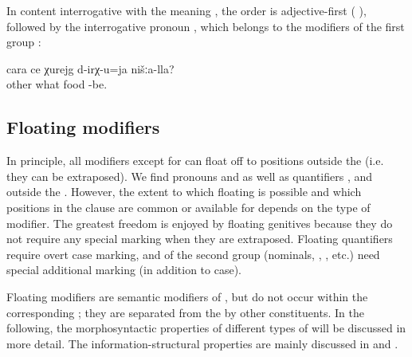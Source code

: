 In content interrogative  with the meaning , the order is adjective-first ( ), followed by the interrogative pronoun  , which belongs to the modifiers of the first group :
%
\begin{exe}
	\ex	\label{ex:What other food of ours exists@12}
	\gll	cara	ce	χurejg	d-irχ-u=ja	nišːa-lla?\\
		other	what	food	-be.	\\
	\glt	{}
\end{exe}


\subsection{Floating modifiers}
\label{ssec:Floating modifiers}
In principle, all modifiers except for  can float off to positions outside the  (i.e. they can be extraposed). We find  pronouns  and    as well as quantifiers ,   and   outside the . However, the extent to which floating is possible and which positions in the clause are common or available for  depends on the type of modifier. The greatest freedom is enjoyed by floating genitives because they do not require any special marking when they are extraposed. Floating quantifiers require overt case marking, and  of the second group (nominals, , , etc.) need special additional marking (in addition to case). 

Floating modifiers are semantic modifiers of , but do not occur within the corresponding ; they are separated from the  by other constituents. In the following, the morphosyntactic properties of different types of  will be discussed in more detail. The information-structural properties are mainly discussed in  and .

